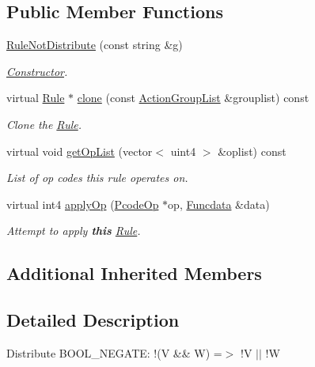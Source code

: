 \subsection*{Public Member Functions}
\begin{DoxyCompactItemize}
\item 
\mbox{\hyperlink{class_rule_not_distribute_a314c8875a54b09a0206cafb4c023d08a}{Rule\+Not\+Distribute}} (const string \&g)
\begin{DoxyCompactList}\small\item\em \mbox{\hyperlink{class_constructor}{Constructor}}. \end{DoxyCompactList}\item 
virtual \mbox{\hyperlink{class_rule}{Rule}} $\ast$ \mbox{\hyperlink{class_rule_not_distribute_a15ef3668c177ca8008f4ca27b627c9c3}{clone}} (const \mbox{\hyperlink{class_action_group_list}{Action\+Group\+List}} \&grouplist) const
\begin{DoxyCompactList}\small\item\em Clone the \mbox{\hyperlink{class_rule}{Rule}}. \end{DoxyCompactList}\item 
virtual void \mbox{\hyperlink{class_rule_not_distribute_acca6a5aa2370ed69db49818ad3d61f1b}{get\+Op\+List}} (vector$<$ uint4 $>$ \&oplist) const
\begin{DoxyCompactList}\small\item\em List of op codes this rule operates on. \end{DoxyCompactList}\item 
virtual int4 \mbox{\hyperlink{class_rule_not_distribute_af010b4c83cf55e7c1c858941f72e048b}{apply\+Op}} (\mbox{\hyperlink{class_pcode_op}{Pcode\+Op}} $\ast$op, \mbox{\hyperlink{class_funcdata}{Funcdata}} \&data)
\begin{DoxyCompactList}\small\item\em Attempt to apply {\bfseries{this}} \mbox{\hyperlink{class_rule}{Rule}}. \end{DoxyCompactList}\end{DoxyCompactItemize}
\subsection*{Additional Inherited Members}


\subsection{Detailed Description}
Distribute B\+O\+O\+L\+\_\+\+N\+E\+G\+A\+TE\+: {\ttfamily !(V \&\& W) =$>$ !V $\vert$$\vert$ !W} 

